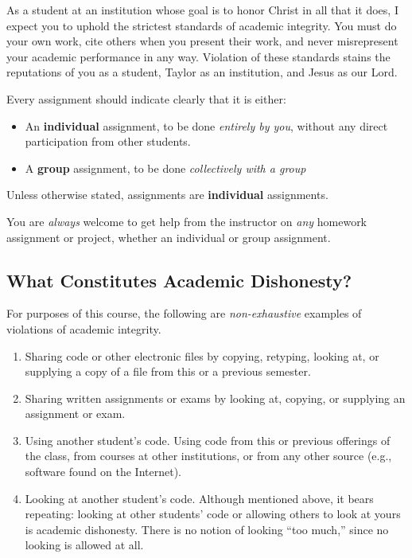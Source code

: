 As a student at an institution whose goal is to honor Christ in all that it does,
I expect you to uphold the strictest standards of academic integrity.
You must do your own work,
cite others when you present their work,
and never misrepresent your academic performance in any way.
Violation of these standards stains the reputations of you as a student,
Taylor as an institution,
and Jesus as our Lord.

Every assignment should indicate clearly
that it is either:
\begin{itemize}
\item An \textbf{individual} assignment,
  to be done \emph{entirely by you},
  without any direct participation from other students.
\item A \textbf{group} assignment, to be done \emph{collectively with a group}
\end{itemize}
Unless otherwise stated,
assignments are \textbf{individual} assignments.

\begin{flushleft}
  \begin{framed}
    You are \emph{always} welcome
    to get help from the instructor on \emph{any}
    homework assignment or project,
    whether an individual or group assignment.
  \end{framed}
\end{flushleft}

\subsection{What Constitutes Academic Dishonesty?}
\label{sec:what-is}

For purposes of this course, the following are \emph{non-exhaustive} examples
of violations of academic integrity.
\begin{enumerate}
\item
  Sharing code or other electronic files by copying, retyping, looking at,
  or supplying a copy of a file from this or a previous semester. 
\item
  Sharing written assignments or exams by looking at, copying, or supplying
  an assignment or exam.
\item
  Using another student's code. Using code from this or previous offerings of the
  class, from courses at other institutions, or from any other source (e.g.,
  software found on the Internet).
\item\label{i:looking}
  Looking at another student's code. Although mentioned above, it bears
  repeating: looking at other students' code or allowing others to look at yours
  is academic dishonesty. There is no notion of looking ``too much,'' since no looking is
  allowed at all.
\end{enumerate}

